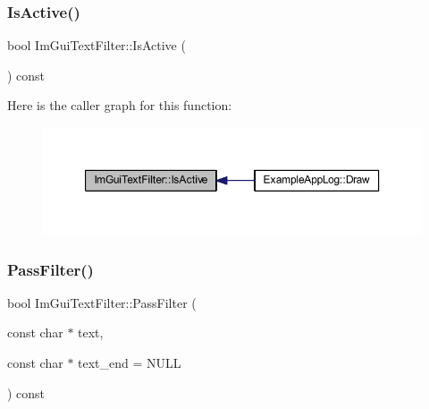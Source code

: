 \subsubsection{\texorpdfstring{Is\+Active()}{IsActive()}}
{\footnotesize\ttfamily bool Im\+Gui\+Text\+Filter\+::\+Is\+Active (\begin{DoxyParamCaption}{ }\end{DoxyParamCaption}) const\hspace{0.3cm}{\ttfamily [inline]}}

Here is the caller graph for this function\+:
\nopagebreak
\begin{figure}[H]
\begin{center}
\leavevmode
\includegraphics[width=350pt]{struct_im_gui_text_filter_a493158f2ab8f45fcf303c3f953be9b88_icgraph}
\end{center}
\end{figure}
\mbox{\label{struct_im_gui_text_filter_a88d73ff8b81fbbd0a129b1bf3498d8aa}} 
\subsubsection{\texorpdfstring{Pass\+Filter()}{PassFilter()}}
{\footnotesize\ttfamily bool Im\+Gui\+Text\+Filter\+::\+Pass\+Filter (\begin{DoxyParamCaption}\item[{const char $\ast$}]{text,  }\item[{const char $\ast$}]{text\+\_\+end = {\ttfamily NULL} }\end{DoxyParamCaption}) const}

